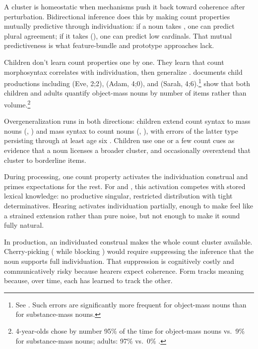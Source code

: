 \documentclass[12pt,a4paper]{article}
\begin{document}
A cluster is homeostatic when mechanisms push it back toward coherence after perturbation. Bidirectional inference does this by making count properties mutually predictive through individuation: if a noun takes , one can predict plural agreement; if it takes (), one can predict low cardinals. That mutual predictiveness is what feature-bundle and prototype approaches lack.

Children don't learn count properties one by one. They learn that count morphosyntax correlates with individuation, then generalize \citep{gordon1985,gordon1988,bloom1994a,barner2005}. \textcite{bloom1994a} documents child productions including  (Eve, 2;2),  (Adam, 4;0), and  (Sarah, 4;6).\footnote{See \textcite[Table~3.2, pp.~59--60]{bloom1994a}. Such errors are significantly more frequent for object-mass nouns than for substance-mass nouns.} \textcite{barner2005} show that both children and adults quantify object-mass nouns by number of items rather than volume.\footnote{4-year-olds chose by number 95\% of the time for object-mass nouns vs.\ 9\% for substance-mass nouns; adults: 97\% vs.\ 0\% \citep[pp.~50--51]{barner2005}.}

Overgeneralization runs in both directions: children extend count syntax to mass nouns (, ) and mass syntax to count nouns (, ), with errors of the latter type persisting through at least age six \citep{gordon1985,gathercole1985}. Children use one or a few count cues as evidence that a noun licenses a broader cluster, and occasionally overextend that cluster to borderline items.

During processing, one count property activates the individuation construal and primes expectations for the rest. For  and , this activation competes with stored lexical knowledge: no productive singular, restricted distribution with tight determinatives. Hearing  activates individuation partially, enough to make  feel like a strained extension rather than pure noise, but not enough to make it sound fully natural.

In production, an individuated construal makes the whole count cluster available. Cherry-picking ( while blocking ) would require suppressing the inference that the noun supports full individuation. That suppression is cognitively costly and communicatively risky because hearers expect coherence. Form tracks meaning because, over time, each has learned to track the other.
\end{document}
